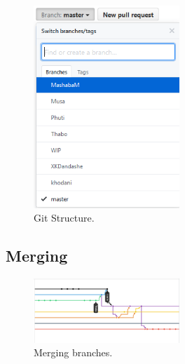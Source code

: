 \documentclass[english]{article}
\begin{document}
\begin{figure}
	\caption{Git Structure.}
	\label{wrap-fig:8}
	\includegraphics[width=5.5cm]{images/GitStructure.png}
\end{figure} 


\subsection{Merging}
\begin{figure}
	\caption{Merging branches.}
	\label{wrap-fig:9}
	\includegraphics[width=5.5cm]{images/merging.png}
\end{figure} 

		
\end{document}
